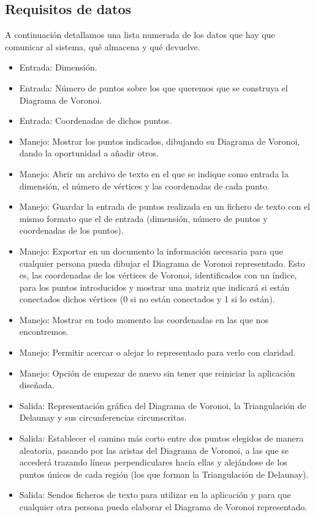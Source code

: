 \subsection{Requisitos de datos}

A continuación detallamos una lista numerada de los datos que hay que comunicar al sistema, qué almacena y qué devuelve. 

\begin{itemize}
    \item[\ding{224}] Entrada: Dimensión.
    \item[\ding{224}] Entrada: Número de puntos sobre los que queremos que se construya el Diagrama de Voronoi.
    \item[\ding{224}] Entrada: Coordenadas de dichos puntos.
    \item[\ding{224}] Manejo: Mostrar los puntos indicados, dibujando su Diagrama de Voronoi, dando la oportunidad a añadir otros.
    \item[\ding{224}] Manejo: Abrir un archivo de texto en el que se indique como entrada la dimensión, el número de vértices y las coordenadas de cada punto.
    \item[\ding{224}] Manejo: Guardar la entrada de puntos realizada en un fichero de texto con el mismo formato que el de entrada (dimensión, número de puntos y coordenadas de los puntos). 
    \item[\ding{224}] Manejo: Exportar en un documento la información necesaria para que cualquier persona pueda dibujar el Diagrama de Voronoi representado. Esto es, las coordenadas de los vértices de Voronoi, identificados con un índice, para los puntos introducidos y mostrar una matriz que indicará si están conectados dichos vértices (0 si no están conectados y 1 si lo están).
    \item[\ding{224}] Manejo: Mostrar en todo momento las coordenadas en las que nos encontremos. 
    \item[\ding{224}] Manejo: Permitir acercar o alejar lo representado para verlo con claridad.
    \item[\ding{224}] Manejo: Opción de empezar de nuevo sin tener que reiniciar la aplicación diseñada.
    \item[\ding{224}] Salida: Representación gráfica del Diagrama de Voronoi, la Triangulación de Delaunay y sus circunferencias circunscritas.
    \item[\ding{224}] Salida: Establecer el camino más corto entre dos puntos elegidos de manera aleatoria, pasando por las aristas del Diagrama de Voronoi, a las que se accederá trazando líneas perpendiculares hacia ellas y alejándose de los puntos únicos de cada región (los que forman la Triangulación de Delaunay).
    \item[\ding{224}] Salida: Sendos ficheros de texto para utilizar en la aplicación y para que cualquier otra persona pueda elaborar el Diagrama de Voronoi representado.    
\end{itemize}


